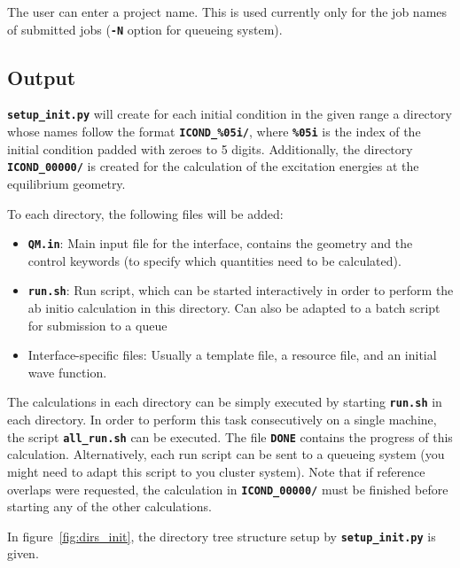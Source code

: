 \documentclass[a4paper,10pt,DIV=15,openany]{scrbook}
\newcommand{\ttt}[1]{\textbf{\texttt{#1}}}
\begin{document}
The user can enter a project name. This is used currently only for the job names of submitted jobs (\ttt{-N} option for queueing system).

\subsection{Output}

\ttt{setup\_init.py} will create for each initial condition in the given range a directory whose names follow the format \ttt{ICOND\_\%05i/}, where \ttt{\%05i} is the index of the initial condition padded with zeroes to 5 digits. Additionally, the directory \ttt{ICOND\_00000/} is created for the calculation of the excitation energies at the equilibrium geometry.

To each directory, the following files will be added:
\begin{itemize}
  \item \ttt{QM.in}: Main input file for the interface, contains the geometry and the control keywords (to specify which quantities need to be calculated). 
  \item \ttt{run.sh}: Run script, which can be started interactively in order to perform the ab initio calculation in this directory. Can also be adapted to a batch script for submission to a queue 
  \item Interface-specific files: Usually a template file, a resource file, and an initial wave function.
\end{itemize}

The calculations in each directory can be simply executed by starting \ttt{run.sh} in each directory. In order to perform this task consecutively on a single machine, the script \ttt{all\_run.sh} can be executed. The file \ttt{DONE} contains the progress of this calculation.
Alternatively, each run script can be sent to a queueing system (you might need to adapt this script to you cluster system).
Note that if reference overlaps were requested, the calculation in \ttt{ICOND\_00000/} must be finished before starting any of the other calculations.

In figure~\ref{fig:dirs_init}, the directory tree structure setup by \ttt{setup\_init.py} is given.
\end{document}
